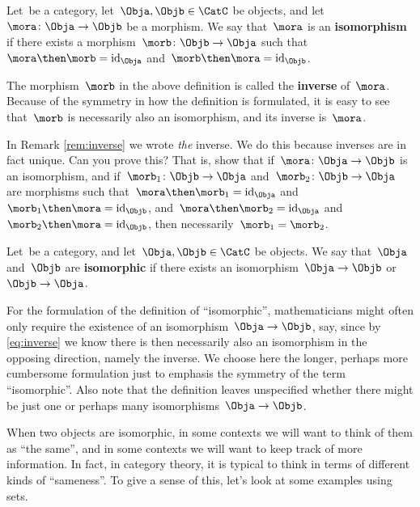 \begin{ctdefinition}[Isomorphism]
  Let~\CatC be a category, let~$\Obja,\Objb \in \CatC$ be objects, and let~$\mora \colon \Obja \to \Objb$ be a morphism. We say that~$\mora$ is an \textbf{isomorphism} if there exists a morphism~$\morb\colon \Objb \to \Obja$ such that~$\mora \then \morb = \text{id}_\Obja$ and~$\morb \then \mora = \text{id}_\Objb$.
\end{ctdefinition}

\begin{remark}
  \label{rem:inverse}
  The morphism~$\morb$ in the above definition is called the \textbf{inverse} of~$\mora$. Because of the symmetry in how the definition is formulated, it is easy to see that~$\morb$ is necessarily also an isomorphism, and its inverse is~$\mora$.
\end{remark}

\begin{exercise}
  In Remark \cref{rem:inverse} we wrote \emph{the} inverse. We do this because inverses are in fact unique. Can you prove this?
  That is, show that if~$\mora \colon \Obja \to \Objb$ is an isomorphism, and if~$\morb_1\colon \Objb \to \Obja$ and~$\morb_2\colon \Objb \to \Obja$ are morphisms such that~$\mora \then \morb_1 = \text{id}_\Obja$ and~$\morb_1 \then \mora = \text{id}_\Objb$, and~$\mora \then \morb_2 = \text{id}_\Obja$ and~$\morb_2 \then \mora = \text{id}_\Objb$, then necessarily~$\morb_1 = \morb_2$.
\end{exercise}

\begin{ctdefinition}[Isomorphic]
  Let~\CatC be a category, and let~$\Obja,\Objb \in \CatC$ be objects. We say that~$\Obja$ and~$\Objb$ are \textbf{isomorphic} if there exists an isomorphism~$\Obja \to \Objb$ or~$\Objb \to \Obja$.
\end{ctdefinition}

For the formulation of the definition of ``isomorphic'', mathematicians might often only require the existence of an isomorphism~$\Obja \to \Objb$, say, since by \cref{eq:inverse} we know there is then necessarily also an isomorphism in the opposing direction, namely the inverse. We choose here the longer, perhaps more cumbersome formulation just to emphasis the symmetry of the term ``isomorphic''. Also note that the definition leaves unspecified whether there might be just one or perhaps many isomorphisms~$\Obja \to \Objb$.

When two objects are isomorphic, in some contexts we will want to think of them as ``the same'', and in some contexts we will want to keep track of more information. In fact, in category theory, it is typical to think in terms of different kinds of ``sameness''. To give a sense of this, let's look at some examples using sets.

